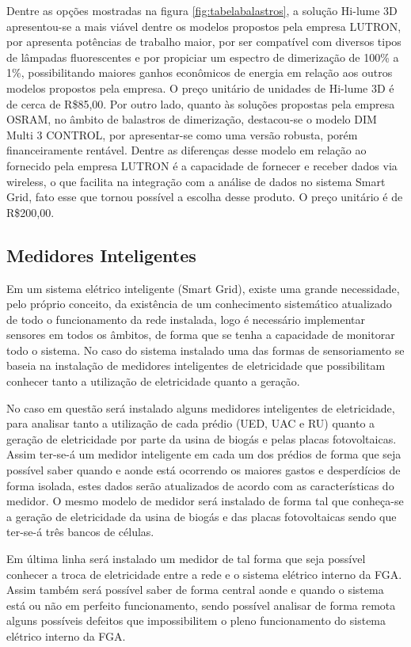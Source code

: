 Dentre as opções mostradas na figura \ref{fig:tabelabalastros}, a solução Hi-lume 3D apresentou-se a mais viável dentre os modelos propostos pela empresa LUTRON, por apresenta potências de trabalho maior, por ser compatível com diversos tipos de lâmpadas fluorescentes e por propiciar um espectro de dimerização de 100\% a 1\%, possibilitando maiores ganhos econômicos de energia em relação aos outros modelos propostos pela empresa. O preço unitário de unidades de Hi-lume 3D é de cerca de R\$85,00. Por outro lado, quanto às soluções propostas pela empresa OSRAM, no âmbito de balastros de dimerização, destacou-se o modelo DIM Multi 3 CONTROL, por apresentar-se como uma versão robusta, porém financeiramente rentável. Dentre as diferenças desse modelo em relação ao fornecido pela empresa LUTRON é a capacidade de fornecer e receber dados via wireless, o que facilita na integração com a análise de dados no sistema Smart Grid, fato esse que tornou possível a escolha desse produto. O preço unitário é de R\$200,00.

\subsection{Medidores Inteligentes} 
Em um sistema elétrico inteligente (Smart Grid), existe uma grande necessidade, pelo próprio conceito, da existência de um conhecimento sistemático atualizado de todo o funcionamento da rede instalada, logo é necessário implementar sensores em todos os âmbitos, de forma que se tenha a capacidade de monitorar todo o sistema. No caso do sistema instalado uma das formas de sensoriamento se baseia na instalação de medidores inteligentes de eletricidade que possibilitam conhecer tanto a utilização de eletricidade quanto a geração.

No caso em questão será instalado alguns medidores inteligentes de eletricidade, para analisar tanto a utilização de cada prédio (UED, UAC e RU) quanto a geração de eletricidade por parte da usina de biogás e pelas placas fotovoltaicas. Assim ter-se-á um medidor inteligente em cada um dos prédios de forma que seja possível saber quando e aonde está ocorrendo os maiores gastos e desperdícios de forma isolada, estes dados serão atualizados de acordo com as características do medidor. O mesmo modelo de medidor será instalado de forma tal que conheça-se a geração de eletricidade da usina de biogás e das placas fotovoltaicas sendo que ter-se-á três bancos de células.

Em última linha será instalado um medidor de tal forma que seja possível conhecer a troca de eletricidade entre a rede e o sistema elétrico interno da FGA. Assim também será possível saber de forma central aonde e quando o sistema está ou não em perfeito funcionamento, sendo possível analisar de forma remota alguns possíveis defeitos que impossibilitem o pleno funcionamento do sistema elétrico interno da FGA.

